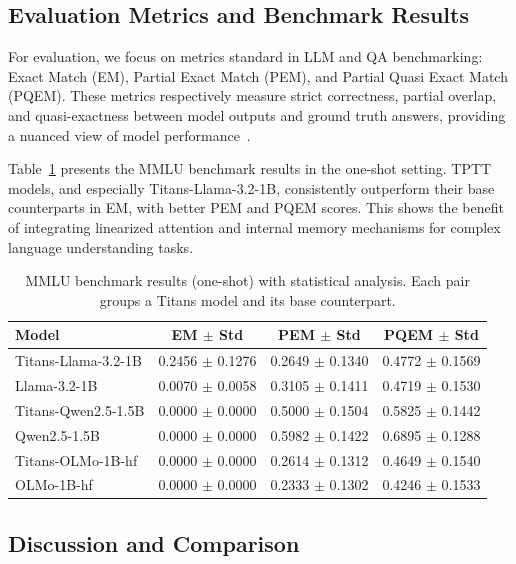 \documentclass[10pt,a4paper]{article}
\begin{document}
    

\subsection{Evaluation Metrics and Benchmark Results}

For evaluation, we focus on metrics standard in LLM and QA benchmarking: Exact Match (EM), Partial Exact Match (PEM), and Partial Quasi Exact Match (PQEM). These metrics respectively measure strict correctness, partial overlap, and quasi-exactness between model outputs and ground truth answers, providing a nuanced view of model performance~\cite{hendrycks2020measuring}.

Table~\ref{tab:mmlu-results} presents the MMLU benchmark results in the one-shot setting. TPTT models, and especially Titans-Llama-3.2-1B, consistently outperform their base counterparts in EM, with better PEM and PQEM scores. This shows the benefit of integrating linearized attention and internal memory mechanisms for complex language understanding tasks.

\begin{table}[h!]
    \centering
    \renewcommand{\arraystretch}{1.2}
    \begin{tabular}{|l|c|c|c|}
    \hline
    Model & EM $\pm$ Std & PEM $\pm$ Std & PQEM $\pm$ Std \\
    \hline
    Titans-Llama-3.2-1B & 0.2456 $\pm$ 0.1276 & 0.2649 $\pm$ 0.1340 & 0.4772 $\pm$ 0.1569 \\
    Llama-3.2-1B        & 0.0070 $\pm$ 0.0058 & 0.3105 $\pm$ 0.1411 & 0.4719 $\pm$ 0.1530 \\
    \hline
    Titans-Qwen2.5-1.5B & 0.0000 $\pm$ 0.0000 & 0.5000 $\pm$ 0.1504 & 0.5825 $\pm$ 0.1442 \\
    Qwen2.5-1.5B        & 0.0000 $\pm$ 0.0000 & 0.5982 $\pm$ 0.1422 & 0.6895 $\pm$ 0.1288 \\
    \hline
    Titans-OLMo-1B-hf   & 0.0000 $\pm$ 0.0000 & 0.2614 $\pm$ 0.1312 & 0.4649 $\pm$ 0.1540 \\
    OLMo-1B-hf          & 0.0000 $\pm$ 0.0000 & 0.2333 $\pm$ 0.1302 & 0.4246 $\pm$ 0.1533 \\
    \hline
    \end{tabular}
    \caption{MMLU benchmark results (one-shot) with statistical analysis. Each pair groups a Titans model and its base counterpart.}
    \label{tab:mmlu-results}
    \end{table}


\subsection{Discussion and Comparison}
\end{document}
